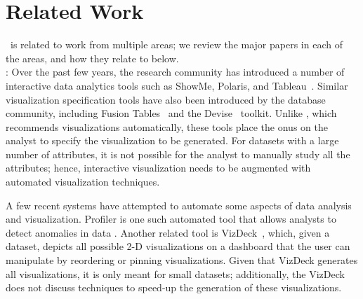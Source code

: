 

\section{Related Work}
\label{sec:related_work}
\VizRecDB\ is related to work from multiple areas;
we review the major papers in each of the areas, and how they relate to
\VizRecDB below. \\

:
Over the past few years, the research community has introduced a number of
interactive data analytics tools such as ShowMe, Polaris, and 
Tableau~\cite{DBLP:journals/cacm/StolteTH08, DBLP:journals/tvcg/MackinlayHS07}.
Similar visualization specification tools have also been introduced by the
database community, including Fusion
Tables~\cite{DBLP:conf/sigmod/GonzalezHJLMSSG10} and the
Devise~\cite{DBLP:conf/sigmod/LivnyRBCDLMW97} toolkit. 
Unlike \VizRecDB, which recommends visualizations automatically, these tools place
the onus on the analyst to specify the visualization to be generated.
For datasets with a large number of attributes, it is not possible
for the analyst to manually study all the attributes; hence, interactive
visualization needs to be augmented with automated visualization techniques.

A few recent systems have attempted to automate some aspects of data analysis
and visualization. Profiler is one such automated tool that allows analysts to
detect anomalies in data \cite{DBLP:conf/AVI/KandelPPHH12}.
Another related tool 
is VizDeck~\cite{DBLP:conf/sigmod/KeyHPA12}, which, given a dataset,
depicts all possible 2-D visualizations on a dashboard that the user can
manipulate by reordering or pinning visualizations.
Given that VizDeck generates all visualizations, it is only meant for 
small datasets; additionally, the VizDeck does not discuss techniques
to speed-up the generation of these visualizations. 

